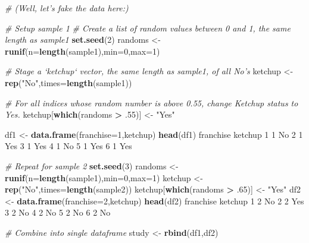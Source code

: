 \documentclass[
]{book}
\newenvironment{Shaded}{\begin{snugshade}}{\end{snugshade}}
\newcommand{\CommentTok}[1]{\textcolor[rgb]{0.56,0.35,0.01}{\textit{#1}}}
\newcommand{\DataTypeTok}[1]{\textcolor[rgb]{0.13,0.29,0.53}{#1}}
\newcommand{\DecValTok}[1]{\textcolor[rgb]{0.00,0.00,0.81}{#1}}
\newcommand{\FloatTok}[1]{\textcolor[rgb]{0.00,0.00,0.81}{#1}}
\newcommand{\KeywordTok}[1]{\textcolor[rgb]{0.13,0.29,0.53}{\textbf{#1}}}
\newcommand{\NormalTok}[1]{#1}
\newcommand{\OperatorTok}[1]{\textcolor[rgb]{0.81,0.36,0.00}{\textbf{#1}}}
\newcommand{\StringTok}[1]{\textcolor[rgb]{0.31,0.60,0.02}{#1}}
\begin{document}
\begin{Shaded}
\begin{Highlighting}[]
\CommentTok{# (Well, let's fake the data here:)}

\CommentTok{# Setup sample 1}
\CommentTok{# Create a list of random values between 0 and 1, the same length as sample1}
\KeywordTok{set.seed}\NormalTok{(}\DecValTok{2}\NormalTok{)}
\NormalTok{randoms <-}\StringTok{ }\KeywordTok{runif}\NormalTok{(}\DataTypeTok{n=}\KeywordTok{length}\NormalTok{(sample1),}\DataTypeTok{min=}\DecValTok{0}\NormalTok{,}\DataTypeTok{max=}\DecValTok{1}\NormalTok{)}

\CommentTok{# Stage a `ketchup` vector, the same length as sample1, of all No's}
\NormalTok{ketchup <-}\StringTok{ }\KeywordTok{rep}\NormalTok{(}\StringTok{"No"}\NormalTok{,}\DataTypeTok{times=}\KeywordTok{length}\NormalTok{(sample1))}

\CommentTok{# For all indices whose random number is above 0.55, change Ketchup status to Yes.}
\NormalTok{ketchup[}\KeywordTok{which}\NormalTok{(randoms }\OperatorTok{>}\StringTok{ }\FloatTok{.55}\NormalTok{)] <-}\StringTok{ "Yes"}

\NormalTok{df1 <-}\StringTok{ }\KeywordTok{data.frame}\NormalTok{(}\DataTypeTok{franchise=}\DecValTok{1}\NormalTok{,ketchup)}
\KeywordTok{head}\NormalTok{(df1)}
\NormalTok{  franchise ketchup}
\DecValTok{1}         \DecValTok{1}\NormalTok{      No}
\DecValTok{2}         \DecValTok{1}\NormalTok{     Yes}
\DecValTok{3}         \DecValTok{1}\NormalTok{     Yes}
\DecValTok{4}         \DecValTok{1}\NormalTok{      No}
\DecValTok{5}         \DecValTok{1}\NormalTok{     Yes}
\DecValTok{6}         \DecValTok{1}\NormalTok{     Yes}

\CommentTok{# Repeat for sample 2}
\KeywordTok{set.seed}\NormalTok{(}\DecValTok{3}\NormalTok{)}
\NormalTok{randoms <-}\StringTok{ }\KeywordTok{runif}\NormalTok{(}\DataTypeTok{n=}\KeywordTok{length}\NormalTok{(sample1),}\DataTypeTok{min=}\DecValTok{0}\NormalTok{,}\DataTypeTok{max=}\DecValTok{1}\NormalTok{)}
\NormalTok{ketchup <-}\StringTok{ }\KeywordTok{rep}\NormalTok{(}\StringTok{"No"}\NormalTok{,}\DataTypeTok{times=}\KeywordTok{length}\NormalTok{(sample2))}
\NormalTok{ketchup[}\KeywordTok{which}\NormalTok{(randoms }\OperatorTok{>}\StringTok{ }\FloatTok{.65}\NormalTok{)] <-}\StringTok{ "Yes"}
\NormalTok{df2 <-}\StringTok{ }\KeywordTok{data.frame}\NormalTok{(}\DataTypeTok{franchise=}\DecValTok{2}\NormalTok{,ketchup)}
\KeywordTok{head}\NormalTok{(df2)}
\NormalTok{  franchise ketchup}
\DecValTok{1}         \DecValTok{2}\NormalTok{      No}
\DecValTok{2}         \DecValTok{2}\NormalTok{     Yes}
\DecValTok{3}         \DecValTok{2}\NormalTok{      No}
\DecValTok{4}         \DecValTok{2}\NormalTok{      No}
\DecValTok{5}         \DecValTok{2}\NormalTok{      No}
\DecValTok{6}         \DecValTok{2}\NormalTok{      No}

\CommentTok{# Combine into single dataframe}
\NormalTok{study <-}\StringTok{ }\KeywordTok{rbind}\NormalTok{(df1,df2)}
\end{Highlighting}
\end{Shaded}
\end{document}
